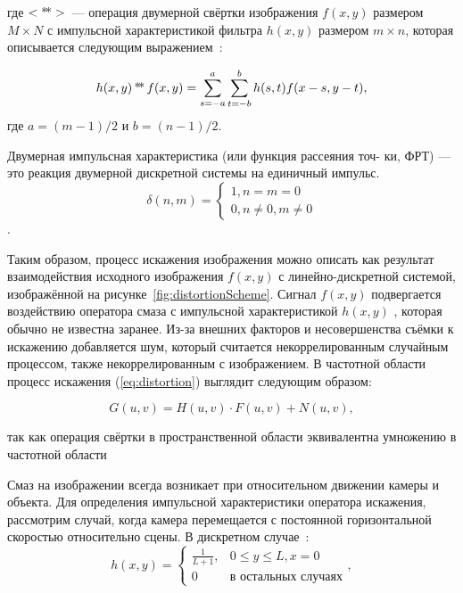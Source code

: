 где $<\operatorname*{*\!*}>$~--- операция двумерной свёртки изображения $f(x,y)$ размером $M\times N$ с импульсной характеристикой фильтра $h(x,y)$ размером $m\times n$, которая описывается следующим выражением~\cite[стр.~298]{gonsalesDigital2012}:

\begin{equation}
h(x,y) \operatorname*{*\!*} f(x,y) = \sum_{s=-a}^{a}\sum_{t=-b}^{b}h(s,t)f(x-s, y-t),
\end{equation}
где $a=(m-1)/2$ и $b = (n-1)/2$.

\begin{definition}\label{def:impulseResponse}
Двумерная импульсная характеристика (или функция рассеяния точ-
ки, ФРТ) — это реакция двумерной дискретной системы на единичный импульс.
$$\delta(n,m) = 
	\begin{cases}
		1, n=m=0\\
		0, n\ne 0, m\ne 0
	\end{cases}$$.
\end{definition}

Таким образом, процесс искажения изображения можно описать как результат взаимодействия исходного изображения $f(x, y)$ с линейно-дискретной системой, изображённой на рисунке~\ref{fig:distortionScheme}. Сигнал $f(x, y)$ подвергается воздействию оператора смаза с импульсной характеристикой $h(x, y)$ , которая обычно не известна заранее. Из-за внешних факторов и несовершенства съёмки к искажению добавляется шум, который считается некоррелированным случайным процессом, также некоррелированным с изображением.
В частотной области процесс искажения (\ref{eq:distortion}) выглядит следующим образом:

\begin{equation}\label{eq:distortionFourier}
G(u,v) = H(u,v)\cdot F(u,v) + N(u,v),
\end{equation}

так как операция свёртки в пространственной области эквивалентна умножению в частотной области\cite[стр.~39]{basicsOfDigitalDataProcessing2016Umnyashkin}

Смаз на изображении всегда возникает при относительном движении камеры и объекта. Для определения импульсной характеристики оператора искажения, рассмотрим случай, когда камера перемещается с постоянной горизонтальной скоростью относительно сцены. В дискретном случае~\cite{iterableImageRestorationBiemonLangdeik}:
\begin{equation}\label{eq:horizontalBlurPsf}
	h(x,y) = 
		\begin{cases}
			\frac{1}{L+1}, & 0 \leq y \leq L, x=0\\
			0              & \text{в остальных случаях}
		\end{cases},
\end{equation}

